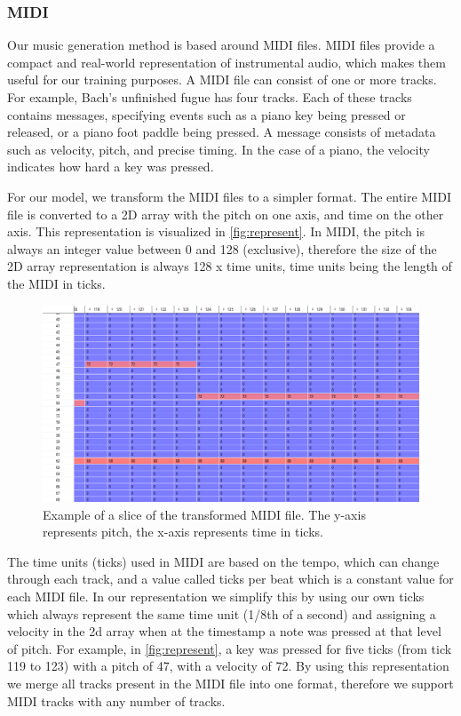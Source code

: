 \documentclass[11pt, twocolumn]{article}
\begin{document}
\subsubsection{MIDI}
Our music generation method is based around MIDI files. MIDI files provide a compact and real-world representation of instrumental audio, which makes them useful for our training purposes. A MIDI file can consist of one or more tracks. For example, Bach's unfinished fugue has four tracks. Each of these tracks contains messages, specifying events such as a piano key being pressed or released, or a piano foot paddle being pressed. A message consists of metadata such as velocity, pitch, and precise timing. In the case of a piano, the velocity indicates how hard a key was pressed. 
\par
For our model, we transform the MIDI files to a simpler format. The entire MIDI file is converted to a 2D array with the pitch on one axis, and time on the other axis. This representation is visualized in \autoref{fig:represent}. In MIDI, the pitch is always an integer value between 0 and 128 (exclusive), therefore the size of the 2D array representation is always 128 x time units, time units being the length of the MIDI in ticks.
\begin{figure}
    \centering
    \includegraphics[width=\textwidth]{images/data.png}
    \caption{Example of a slice of the transformed MIDI file. The y-axis represents pitch, the x-axis represents time in ticks.}
    \label{fig:represent}
\end{figure}
\par
The time units (ticks) used in MIDI are based on the tempo, which can change through each track, and a value called ticks per beat which is a constant value for each MIDI file. In our representation we simplify this by using our own ticks which always represent the same time unit (1/8th of a second) and assigning a velocity in the 2d array when at the timestamp a note was pressed at that level of pitch. For example, in \autoref{fig:represent}, a key was pressed for five ticks (from tick 119 to 123) with a pitch of 47, with a velocity of 72.
By using this representation we merge all tracks present in the MIDI file into one format, therefore we support MIDI tracks with any number of tracks.
\end{document}
